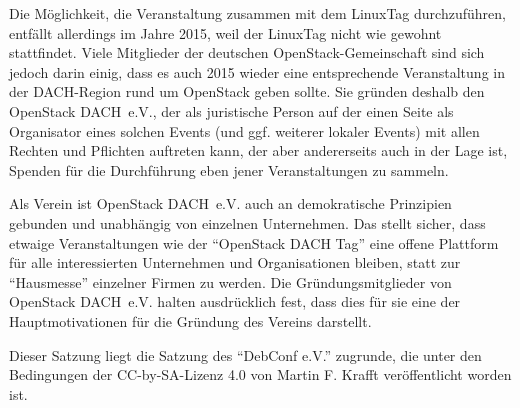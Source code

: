 \documentclass[draft]{scrartcl}
\newcommand{\VereinsName}{OpenStack DACH}
\begin{document}
Die Möglichkeit, die Veranstaltung zusammen mit dem LinuxTag durchzuführen,
entfällt allerdings im Jahre 2015, weil der LinuxTag nicht wie gewohnt
stattfindet. Viele Mitglieder der deutschen OpenStack-Gemeinschaft sind
sich jedoch darin einig, dass es auch 2015 wieder eine entsprechende
Veranstaltung in der DACH-Region rund um OpenStack geben sollte. Sie
gründen deshalb den \VereinsName\ e.V., der als juristische Person auf der
einen Seite als Organisator eines solchen Events (und ggf. weiterer
lokaler Events) mit allen Rechten und Pflichten auftreten kann, der aber
andererseits auch in der Lage ist, Spenden für die Durchführung eben jener
Veranstaltungen zu sammeln.

Als Verein ist \VereinsName\ e.V. auch an demokratische Prinzipien gebunden
und unabhängig von einzelnen Unternehmen. Das stellt sicher, dass etwaige
Veranstaltungen wie der "`OpenStack DACH Tag"' eine offene Plattform für alle
interessierten Unternehmen und Organisationen bleiben, statt zur "`Hausmesse"'
einzelner Firmen zu werden. Die Gründungsmitglieder von \VereinsName\ e.V.
halten ausdrücklich fest, dass dies für sie eine der Hauptmotivationen für die
Gründung des Vereins darstellt.

Dieser Satzung liegt die Satzung des "`DebConf e.V."' zugrunde, die unter
den Bedingungen der CC-by-SA-Lizenz 4.0 von Martin F. Krafft veröffentlicht
worden ist.

\normalsize
\end{document}
